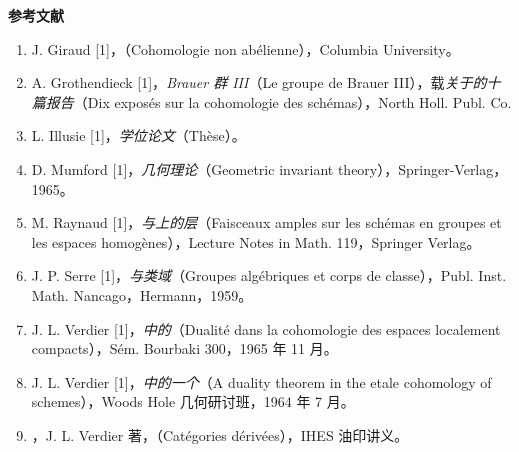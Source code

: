 \medskip
\begin{center}\textbf{参考文献}\end{center}
\begin{enumerate}
\item[{[1]}] J. Giraud [1]，\emph{}（Cohomologie non abélienne），Columbia University。
\item[{[2]}] A. Grothendieck [1]，\emph{Brauer 群 III}（Le groupe de Brauer III），载\emph{关于的十篇报告}（Dix exposés sur la cohomologie des schémas），North Holl. Publ. Co.
\item[{[3]}] L. Illusie [1]，\emph{学位论文}（Thèse）。
\item[{[4]}] D. Mumford [1]，\emph{几何理论}（Geometric invariant theory），Springer-Verlag，1965。
\item[{[5]}] M. Raynaud [1]，\emph{与上的层}（Faisceaux amples sur les schémas en groupes et les espaces homogènes），Lecture Notes in Math. 119，Springer Verlag。
\item[{[6]}] J. P. Serre [1]，\emph{与类域}（Groupes algébriques et corps de classe），Publ. Inst. Math. Nancago，Hermann，1959。
\item[{[7]}] J. L. Verdier [1]，\emph{中的}（Dualité dans la cohomologie des espaces localement compacts），Sém. Bourbaki 300，1965 年 11 月。
\item[{[8]}] J. L. Verdier [1]，\emph{中的一个}（A duality theorem in the etale cohomology of schemes），Woods Hole 几何研讨班，1964 年 7 月。
\item[{[9]}] [C.D.]，J. L. Verdier 著，\emph{}（Catégories dérivées），IHES 油印讲义。
\end{enumerate}
